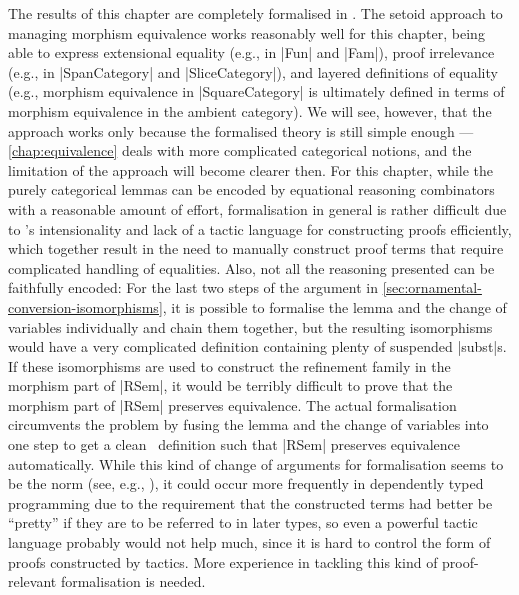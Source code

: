 The results of this chapter are completely formalised in \Agda.
The setoid approach to managing morphism equivalence works reasonably well for this chapter, being able to express extensional equality (e.g., in |Fun| and |Fam|), proof irrelevance (e.g., in |SpanCategory| and |SliceCategory|), and layered definitions of equality (e.g., morphism equivalence in |SquareCategory| is ultimately defined in terms of morphism equivalence in the ambient category).
We will see, however, that the approach works only because the formalised theory is still simple enough --- \autoref{chap:equivalence} deals with more complicated categorical notions, and the limitation of the approach will become clearer then.
For this chapter, while the purely categorical lemmas can be encoded by equational reasoning combinators with a reasonable amount of effort, formalisation in general is rather difficult due to \Agda's intensionality and lack of a tactic language for constructing proofs efficiently, which together result in the need to manually construct proof terms that require complicated handling of equalities.
Also, not all the reasoning presented can be faithfully encoded: For the last two steps of the argument in \autoref{sec:ornamental-conversion-isomorphisms}, it is possible to formalise the lemma and the change of variables individually and chain them together, but the resulting isomorphisms would have a very complicated definition containing plenty of suspended |subst|s.
If these isomorphisms are used to construct the refinement family in the morphism part of |RSem|, it would be terribly difficult to prove that the morphism part of |RSem| preserves equivalence.
The actual formalisation circumvents the problem by fusing the lemma and the change of variables into one step to get a clean \Agda\ definition such that |RSem| preserves equivalence automatically.
While this kind of change of arguments for formalisation seems to be the norm (see, e.g., \citet[Section~4.5]{Avigad-prime-number-theorem}), it could occur more frequently in dependently typed programming due to the requirement that the constructed terms had better be ``pretty'' if they are to be referred to in later types, so even a powerful tactic language probably would not help much, since it is hard to control the form of proofs constructed by tactics.
More experience in tackling this kind of proof-relevant formalisation is needed.
